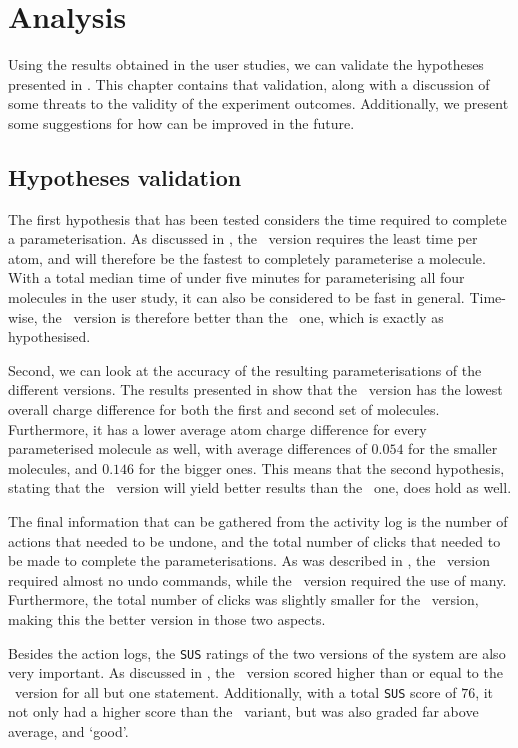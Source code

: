 \chapter{Analysis}

Using the results obtained in the user studies, we can validate the hypotheses presented in . This chapter contains that validation, along with a discussion of some threats to the validity of the experiment outcomes. Additionally, we present some suggestions for how \oframp{} can be improved in the future.



\section{Hypotheses validation}
The first hypothesis that has been tested considers the time required to complete a parameterisation. As discussed in , the \IDb\ version requires the least time per atom, and will therefore be the fastest to completely parameterise a molecule. With a total median time of under five minutes for parameterising all four molecules in the user study, it can also be considered to be fast in general. Time-wise, the \IDb\ version is therefore better than the \IDa\ one, which is exactly as hypothesised.

Second, we can look at the accuracy of the resulting parameterisations of the different versions. The results presented in  show that the \IDa\ version has the lowest overall charge difference for both the first and second set of molecules. Furthermore, it has a lower average atom charge difference for every parameterised molecule as well, with average differences of $0.054$ for the smaller molecules, and $0.146$ for the bigger ones. This means that the second hypothesis, stating that the \IDa\ version will yield better results than the \IDb\ one, does hold as well.

The final information that can be gathered from the activity log is the number of actions that needed to be undone, and the total number of clicks that needed to be made to complete the parameterisations. As was described in , the \IDa\ version required almost no undo commands, while the \IDb\ version required the use of many. Furthermore, the total number of clicks was slightly smaller for the \IDa\ version, making this the better version in those two aspects.

Besides the action logs, the \verb|SUS| ratings of the two versions of the system are also very important. As discussed in , the \IDa\ version scored higher than or equal to the \IDb\ version for all but one statement. Additionally, with a total \verb|SUS| score of $76$, it not only had a higher score than the \IDb\ variant, but was also graded far above average, and `good'.

